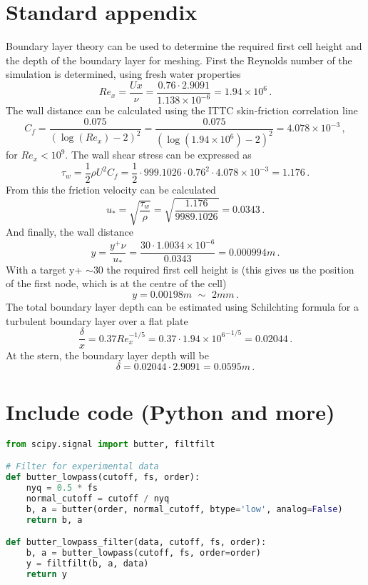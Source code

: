 \section{Standard appendix}
Boundary layer theory can be used to determine the required first cell height and the depth of the boundary layer for meshing. First the Reynolds number of the simulation is determined, using fresh water properties
\begin{equation} 
	Re_{x}=\frac{Ux}{\nu}=\frac{0.76\cdot2.9091}{1.138\times10^{-6}}=1.94\times10^{6} \,.
\end{equation}
The wall distance can be calculated using the ITTC skin-friction correlation line
\begin{equation}
	C_f = \frac{0.075}{(\log(Re_x)-2)^2}=\frac{0.075}{(\log(1.94\times10^{6})-2)^2}=4.078\times10^{-3} \,,
\end{equation} 
for $Re_x < 10^9$. The wall shear stress can be expressed as
\begin{equation}
\tau_{w} = \frac{1}{2}\rho U^2C_f  = \frac{1}{2}\cdot 999.1026 \cdot 0.76^{2}\cdot4.078\times10^{-3}= 1.176 \,.
\end{equation}
From this the friction velocity can be calculated
\begin{equation}
u_{*} = \sqrt{\frac{\tau_{w}}{\rho}} = \sqrt{\frac{1.176}{9989.1026}}=0.0343 \,.
\end{equation}
And finally, the wall distance
\begin{equation}
y = \frac{y^{+}\nu}{u_{*}}=\frac{30\cdot 1.0034\times10^{-6} }{0.0343}= 0.000994 m \,.
\end{equation}
With a target y+ $\sim30$ the required first cell height is (this gives us the position of the first node, which is at the centre of the cell)
\begin{equation}
y=0.00198 m \,\,\sim \,\,2 mm \,.
\end{equation}
The total boundary layer depth can be estimated using Schilchting formula for a turbulent boundary layer over a flat plate \citep{schlichting1979boundary}
\begin{equation}
\frac{\delta}{x}=0.37Re_{x}^{-1/5}=0.37\cdot{1.94\times10^{6}}^{-1/5}= 0.02044 \,.
\end{equation}
At the stern, the boundary layer depth will be
\begin{equation}
\delta = 0.02044\cdot 2.9091 = 0.0595 m \,.
\end{equation}


\section{Include code (Python and more)}
\begin{lstlisting}[language=Python]
from scipy.signal import butter, filtfilt

# Filter for experimental data
def butter_lowpass(cutoff, fs, order):
    nyq = 0.5 * fs
    normal_cutoff = cutoff / nyq
    b, a = butter(order, normal_cutoff, btype='low', analog=False)
    return b, a

def butter_lowpass_filter(data, cutoff, fs, order):
    b, a = butter_lowpass(cutoff, fs, order=order)
    y = filtfilt(b, a, data)					
    return y
\end{lstlisting}
